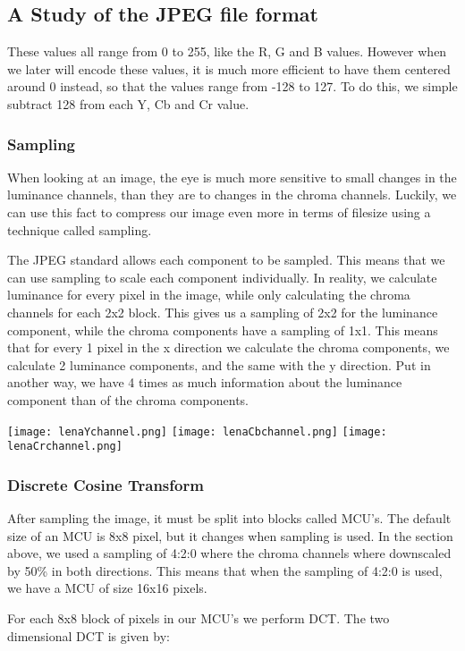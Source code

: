 \begin{infobox}{\section[A Study of the JPEG file format]{A Study of the JPEG file format}}
These values all range from 0 to 255, like the R, G and B values. However when we later will encode these values, it is much more efficient to have them centered around 0 instead, so that the values range from -128 to 127. To do this, we simple subtract 128 from each Y, Cb and Cr value. 

\subsubsection*{Sampling}
When looking at an image, the eye is much more sensitive to small changes in the luminance channels, than they are to changes in the chroma channels. Luckily, we can use this fact to compress our image even more in terms of filesize using a technique called sampling. 

The JPEG standard allows each component to be sampled. This means that we can use sampling to scale each component individually. In reality, we calculate luminance for every pixel in the image, while only calculating the chroma channels for each 2x2 block. This gives us a sampling of 2x2 for the luminance component, while the chroma components have a sampling of 1x1. This means that for every 1 pixel in the x direction we calculate the chroma components, we calculate 2 luminance components, and the same with the y direction. Put in another way, we have 4 times as much information about the luminance component than of the chroma components.

\begin{centering}
\texttt{[image: lenaYchannel.png]}
\texttt{[image: lenaCbchannel.png]}
\texttt{[image: lenaCrchannel.png]}
\label{fig:YCbCrChannels}
\end{centering}

\subsubsection*{Discrete Cosine Transform}
After sampling the image, it must be split into blocks called MCU's. The default size of an MCU is 8x8 pixel, but it changes when sampling is used. In the section above, we used a sampling of 4:2:0 where the chroma channels where downscaled by 50\% in both directions. This means that when the sampling of 4:2:0 is used, we have a MCU of size 16x16 pixels.

For each 8x8 block of pixels in our MCU's we perform DCT. The two dimensional DCT is given by:


\end{infobox}
